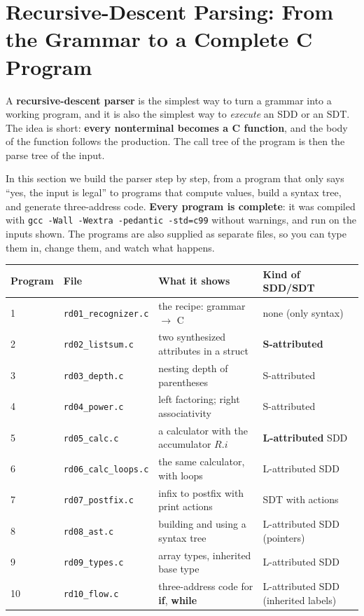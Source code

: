 \documentclass[11pt,a4paper]{article}
\begin{document}
\section{Recursive-Descent Parsing: From the Grammar to a Complete C Program}
\label{sec:rd}

A \textbf{recursive-descent parser} is the simplest way to turn a grammar into a working program, and it is also the simplest way to \emph{execute} an SDD or an SDT. The idea is short: \textbf{every nonterminal becomes a C function}, and the body of the function follows the production. The call tree of the program is then the parse tree of the input.

In this section we build the parser step by step, from a program that only says ``yes, the input is legal'' to programs that compute values, build a syntax tree, and generate three-address code. \textbf{Every program is complete}: it was compiled with \texttt{gcc -Wall -Wextra -pedantic -std=c99} without warnings, and run on the inputs shown. The programs are also supplied as separate files, so you can type them in, change them, and watch what happens.

\begin{center}
\small
\begin{tabular}{@{}l p{4.3cm} p{4.6cm} p{3.6cm}@{}}
\toprule
\textbf{Program} & \textbf{File} & \textbf{What it shows} & \textbf{Kind of SDD/SDT} \\ \midrule
1 & \texttt{rd01\_recognizer.c} & the recipe: grammar $\to$ C & none (only syntax) \\
2 & \texttt{rd02\_listsum.c} & two synthesized attributes in a struct & \textbf{S-attributed} \\
3 & \texttt{rd03\_depth.c} & nesting depth of parentheses & S-attributed \\
4 & \texttt{rd04\_power.c} & left factoring; right associativity & S-attributed \\
5 & \texttt{rd05\_calc.c} & a calculator with the accumulator $R.i$ & \textbf{L-attributed} SDD \\
6 & \texttt{rd06\_calc\_loops.c} & the same calculator, with loops & L-attributed SDD \\
7 & \texttt{rd07\_postfix.c} & infix to postfix with print actions & SDT with actions \\
8 & \texttt{rd08\_ast.c} & building and using a syntax tree & L-attributed SDD (pointers) \\
9 & \texttt{rd09\_types.c} & array types, inherited base type & L-attributed SDD \\
10 & \texttt{rd10\_flow.c} & three-address code for \textbf{if}, \textbf{while} & L-attributed SDD (inherited labels) \\ \bottomrule
\end{tabular}
\end{center}
\end{document}
